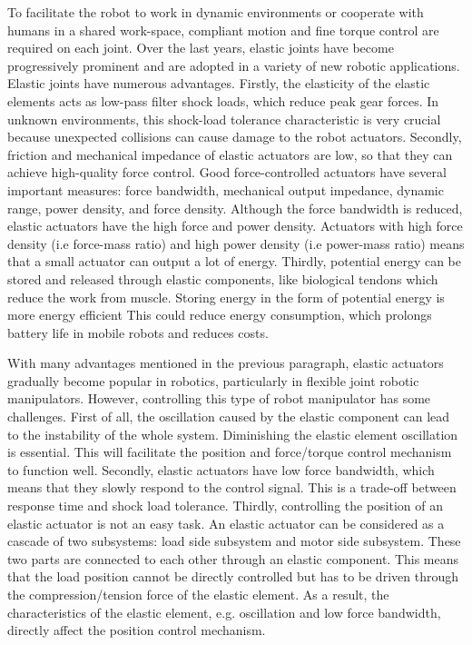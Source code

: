 \documentclass[\main/main.tex]{subfiles}
\begin{document}
To facilitate the robot to work in dynamic environments or cooperate with humans in a shared work-space, compliant motion and fine torque control are required on each joint. Over the last years, elastic joints have become progressively prominent and are adopted in a variety of new robotic applications. Elastic joints have numerous advantages. Firstly, the elasticity of the elastic elements acts as low-pass filter shock loads, which reduce peak gear forces. In unknown environments, this shock-load tolerance characteristic is very crucial because unexpected collisions can cause damage to the robot actuators. Secondly, friction and mechanical impedance of elastic actuators are low, so that they can achieve high-quality force control. Good force-controlled actuators have several important measures: force bandwidth, mechanical output impedance, dynamic range, power density, and force density. Although the force bandwidth is reduced, elastic actuators have the high force and power density. Actuators with high force density (i.e force-mass ratio) and high power density (i.e power-mass ratio) means that a small actuator can output a lot of energy. Thirdly, potential energy can be stored and released through elastic components, like biological tendons which reduce the work from muscle. Storing energy in the form of potential energy is more energy efficient This could reduce energy consumption, which prolongs battery life in mobile robots and reduces costs.

With many advantages mentioned in the previous paragraph, elastic actuators gradually become popular in robotics, particularly in flexible joint robotic manipulators. However, controlling this type of robot manipulator has some challenges. First of all, the oscillation caused by the elastic component can lead to the instability of the whole system. Diminishing the elastic element oscillation is essential. This will facilitate the position and force/torque control mechanism to function well. Secondly, elastic actuators have low force bandwidth, which means that they slowly respond to the control signal. This is a trade-off between response time and shock load tolerance. Thirdly, controlling the position of an elastic actuator is not an easy task. An elastic actuator can be considered as a cascade of two subsystems: load side subsystem and motor side subsystem. These two parts are connected to each other through an elastic component. This means that the load position cannot be directly controlled but has to be driven through the compression/tension force of the elastic element. As a result, the characteristics of the elastic element, e.g. oscillation and low force bandwidth, directly affect the position control mechanism.
\end{document}
